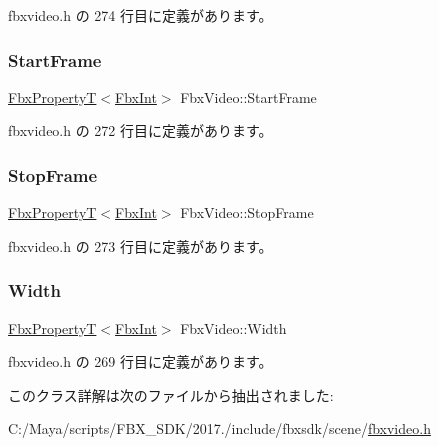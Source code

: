  fbxvideo.\+h の 274 行目に定義があります。

\mbox{\label{class_fbx_video_a61a7c941bfe1022b4cc0a8ba14b932f1}} 
\subsubsection{\texorpdfstring{Start\+Frame}{StartFrame}}
{\footnotesize\ttfamily \hyperlink{class_fbx_property_t}{Fbx\+PropertyT}$<$\hyperlink{fbxtypes_8h_a088fa96de3b0b3ea69f0f6afef525dfb}{Fbx\+Int}$>$ Fbx\+Video\+::\+Start\+Frame}



 fbxvideo.\+h の 272 行目に定義があります。

\mbox{\label{class_fbx_video_aab5d673b818ce8a797ac47851a34e996}} 
\subsubsection{\texorpdfstring{Stop\+Frame}{StopFrame}}
{\footnotesize\ttfamily \hyperlink{class_fbx_property_t}{Fbx\+PropertyT}$<$\hyperlink{fbxtypes_8h_a088fa96de3b0b3ea69f0f6afef525dfb}{Fbx\+Int}$>$ Fbx\+Video\+::\+Stop\+Frame}



 fbxvideo.\+h の 273 行目に定義があります。

\mbox{\label{class_fbx_video_a9f1d9f9874ac3a9274a754cfb311fc30}} 
\subsubsection{\texorpdfstring{Width}{Width}}
{\footnotesize\ttfamily \hyperlink{class_fbx_property_t}{Fbx\+PropertyT}$<$\hyperlink{fbxtypes_8h_a088fa96de3b0b3ea69f0f6afef525dfb}{Fbx\+Int}$>$ Fbx\+Video\+::\+Width}



 fbxvideo.\+h の 269 行目に定義があります。



このクラス詳解は次のファイルから抽出されました\+:\begin{DoxyCompactItemize}
\item 
C\+:/\+Maya/scripts/\+F\+B\+X\+\_\+\+S\+D\+K/2017./include/fbxsdk/scene/\hyperlink{fbxvideo_8h}{fbxvideo.\+h}\end{DoxyCompactItemize}

